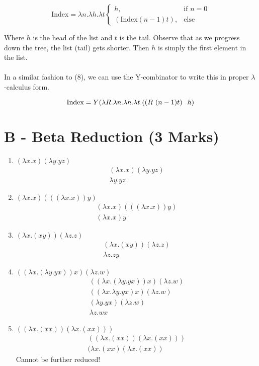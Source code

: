 \documentclass{article}
\begin{document}
\begin{enumerate}
    \[\text{Index} = \lambda n.\lambda h.\lambda t \begin{cases} h, & \text{if } n = 0 \\ (\text{Index}(n-1) t), & \text{else} \end{cases}\]

    Where \(h\) is the head of the list and \(t\) is the tail. Observe that as we progress down the tree, the list (tail) gets shorter. Then \(h\) is simply the first element in the list.\\
    \\
    In a similar fashion to (8), we can use the Y-combinator to write this in proper \(\lambda\)-calculus form.

    \[\text{Index} = Y(\lambda R.\lambda n.\lambda h.\lambda t. ((R \hspace{0.125cm} (n-1) t) \hspace{0.25cm} h)\]
    \color{black}
\end{enumerate}

\newpage
\section{B - Beta Reduction (3 Marks)}
\bigskip
\begin{enumerate}
    \item \((\lambda x.x)(\lambda y.yz)\)
    \color{blue}
    \begin{align}
        (\lambda x.x)(\lambda y.yz) \\
        \lambda y.yz
    \end{align}
    \color{black}
    \item \((\lambda x.x)(((\lambda x.x))y)\)
    \color{blue}
    \begin{align}
        (\lambda x.x)(((\lambda x.x))y) \\
        (\lambda x.x)y
    \end{align}
    \color{black}
    \item \((\lambda x.(xy))(\lambda z.z)\)
    \color{blue}
    \begin{align}
        (\lambda x.(xy))(\lambda z.z) \\
        \lambda z.zy
    \end{align}
    \color{black}
    \item \(((\lambda x.(\lambda y.yx))x)(\lambda z.w)\)
    \color{blue}
    \begin{align}
        ((\lambda x.(\lambda y.yx))x)(\lambda z.w) \\
        ((\lambda x.\lambda y.yx)x)(\lambda z.w) \\
        (\lambda y.yx)(\lambda z.w) \\
        \lambda z.wx
    \end{align}
    \color{black}
    \item \(((\lambda x.(xx))(\lambda x.(xx)))\)
    \color{blue}
    \begin{align}
        ((\lambda x.(xx))(\lambda x.(xx))) \\
        (\lambda x.(xx)(\lambda x.(xx))
    \end{align}
    Cannot be further reduced!
    \color{black}
\end{enumerate}
\end{document}
